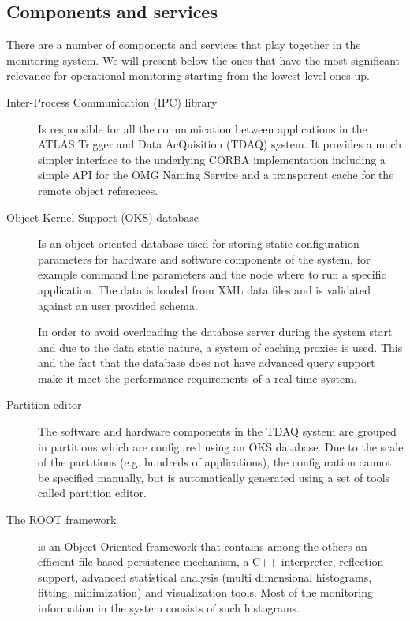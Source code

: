 \subsection*{Components and services}

There are a number of components and services that play together in the monitoring system. We will present below the ones that have the most significant relevance for operational monitoring starting from the lowest level ones up.

\begin{description}
\item[Inter-Process Communication (IPC) library \citep{corso2007data}] Is responsible for all the communication between applications in the ATLAS Trigger and Data AcQuisition (TDAQ)  system. It provides a much simpler interface to the underlying CORBA implementation including a simple API for the OMG Naming Service and a transparent cache for the remote object references.

\item[Object Kernel Support (OKS) database \citep{jones1998oks}\citep{alexandrov2001atlas}] Is an object-oriented database used for storing static configuration parameters for hardware and software components of the system, for example command line parameters and the node where to run a specific application. The data is loaded from XML data files and is validated against an user provided schema. 

In order to avoid overloading the database server during the system start and due to the data static nature, a system of caching proxies is used. This and the fact that the database does not have advanced query support make it meet the performance requirements of a real-time system.

\item[Partition editor] The software and hardware components in the TDAQ system are grouped in partitions which are configured using an OKS database. Due to the scale of the partitions (e.g. hundreds of applications), the configuration cannot be specified manually, but is automatically generated using a set of tools called partition editor.

\item[The ROOT framework \citep{brun1997root}] is an Object Oriented framework that contains among the others an efficient file-based persistence mechanism, a C++ interpreter, reflection support, advanced statistical analysis (multi dimensional histograms, fitting, minimization) and visualization tools. Most of the monitoring information in the system consists of such histograms.


\end{description}
